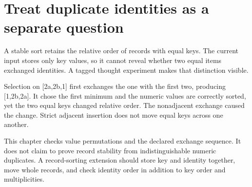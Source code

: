 \section{Treat duplicate identities as a separate
  question}\label{009-sorting-visualizer-p08-treat-duplicate-identities-as-a-separate-question}

A stable sort retains the relative order of records with equal keys. The
current input stores only key values, so it cannot reveal whether two
equal items exchanged identities. A tagged thought experiment makes that
distinction visible.

Selection on {[}2a,2b,1{]} first exchanges the one with the first two,
producing {[}1,2b,2a{]}. It chose the first minimum and the numeric
values are correctly sorted, yet the two equal keys changed relative
order. The nonadjacent exchange caused the change. Strict adjacent
insertion does not move equal keys across one another.

This chapter checks value permutations and the declared exchange
sequence. It does not claim to prove record stability from
indistinguishable numeric duplicates. A record-sorting extension should
store key and identity together, move whole records, and check identity
order in addition to key order and multiplicities.
